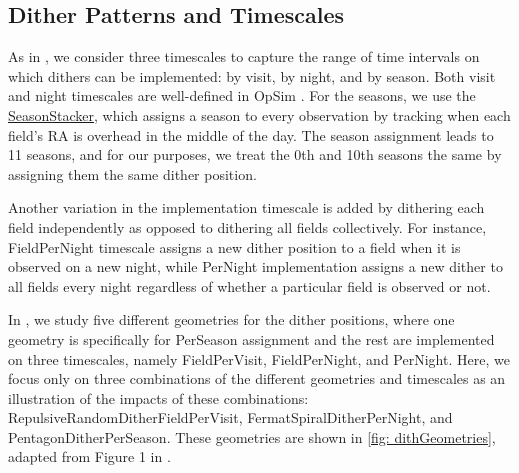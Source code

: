 \subsection{Dither Patterns and Timescales}
\label{sec:\secname:strategies}
As in \citet{AwanEtal2016}, we consider three timescales to capture the range of time intervals on which dithers can be implemented: by visit, by night, and by season. Both visit and night timescales are well-defined in OpSim \citep[see]{IvezicEtal2008}. For the seasons, we use the \href{https://github.com/lsst/sims_maf/blob/master/python/lsst/sims/maf/stackers/generalStackers.py}{SeasonStacker}, which assigns a season to every observation by tracking when each field's RA is overhead in the middle of the day. The season assignment leads to 11 seasons, and for our purposes, we treat the 0th and 10th seasons the same by assigning them the same dither position.

Another variation in the implementation timescale is added by dithering each field independently as opposed to dithering all fields collectively. For instance, FieldPerNight timescale assigns a new dither position to a field when it is observed on a new night, while PerNight implementation assigns a new dither to all fields every night regardless of whether a particular field is observed or not.

In \citet{AwanEtal2016}, we study five different geometries for the dither positions, where one geometry is specifically for PerSeason assignment and the rest are implemented on three timescales, namely FieldPerVisit, FieldPerNight, and PerNight. Here, we focus only on three combinations of the different geometries and timescales as an illustration of the impacts of these combinations: RepulsiveRandomDitherFieldPerVisit, FermatSpiralDitherPerNight,  and PentagonDitherPerSeason. These geometries are shown in \autoref{fig: dithGeometries}, adapted from Figure 1 in \citet{AwanEtal2016}.

